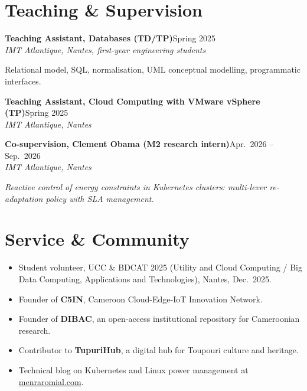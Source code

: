 \documentclass[10pt,a4paper]{article}
\newcommand{\entry}[3]{%
  \textbf{#1}\hfill{\color{muted}#2}\\
  {\color{muted}\itshape #3}\par\vspace{0.2ex}}
\newcommand{\link}[2]{\href{#1}{{\color{accent}#2}}}
\begin{document}
\section{Teaching \& Supervision}
\entry{Teaching Assistant, Databases (TD/TP)}{Spring 2025}{IMT Atlantique, Nantes, first-year engineering students}
Relational model, SQL, normalisation, UML conceptual modelling, programmatic interfaces.
\vspace{1ex}

\entry{Teaching Assistant, Cloud Computing with VMware vSphere (TP)}{Spring 2025}{IMT Atlantique, Nantes}
\vspace{0.6ex}

\entry{Co-supervision, Clement Obama (M2 research intern)}{Apr.\ 2026 -- Sep.\ 2026}{IMT Atlantique, Nantes}
\emph{Reactive control of energy constraints in Kubernetes clusters: multi-lever
re-adaptation policy with SLA management.}

\section{Service \& Community}
\begin{itemize}
  \item Student volunteer, UCC \& BDCAT 2025 (Utility and Cloud Computing / Big Data
        Computing, Applications and Technologies), Nantes, Dec.\ 2025.
  \item Founder of \textbf{C5IN}, Cameroon Cloud-Edge-IoT Innovation Network.
  \item Founder of \textbf{DIBAC}, an open-access institutional repository for Cameroonian
        research.
  \item Contributor to \textbf{TupuriHub}, a digital hub for Toupouri culture and heritage.
  \item Technical blog on Kubernetes and Linux power management at \link{https://menraromial.com}{menraromial.com}.
\end{itemize}

\end{document}
